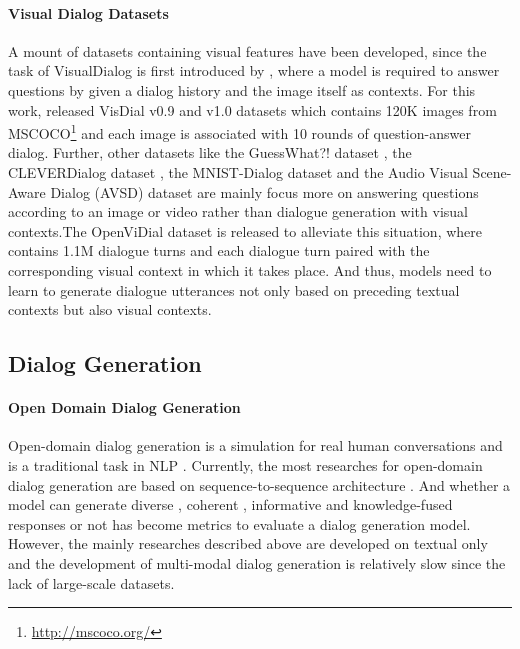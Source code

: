 \documentclass[11pt,a4paper]{article}
\begin{document}
\paragraph{Visual Dialog Datasets} A mount of datasets containing visual features have been developed, since the task of VisualDialog is first introduced by \citet{das2017visual}, where a model is required to answer questions by given a dialog history and the image itself as contexts. For this work, \citet{das2017visual} released VisDial v0.9 and v1.0 datasets which contains 120K images from MSCOCO\footnote{\url{http://mscoco.org/}} and each image is associated with 10 rounds of question-answer dialog. Further, other datasets like the GuessWhat?! dataset \cite{devries2017guesswhat}, the CLEVERDialog dataset \cite{kottur2019clevrdialog}, the MNIST-Dialog dataset \cite{seo2017visual} and the Audio Visual Scene-Aware Dialog (AVSD) dataset \citep{hori2018endtoend,alamri2019audio} are mainly focus more on answering questions according to an image or video rather than dialogue generation with visual contexts.The OpenViDial dataset \cite{meng2020openvidial} is released to alleviate this situation, where contains 1.1M dialogue turns and each dialogue turn paired with the corresponding visual context in which it takes place. And thus, models need to learn to generate dialogue utterances not only based on preceding textual contexts but also visual contexts.

\subsection{Dialog Generation}

\paragraph{Open Domain Dialog Generation} Open-domain dialog generation is a simulation for real human conversations and is a traditional task in NLP \citep{weizenbaum1966eliza, COLBY197537, Wallace2009}. Currently, the most researches for open-domain dialog generation are based on sequence-to-sequence architecture \citep{vinyals2015neural, li2015diversity, dodge2016evaluating, serban2016hierarchical, zhao2017learning, xie2017data, lee2019convlab, ghandeharioun2019approximating, li2020teaching, han2020explaining, zhang2019dialogpt, roller2020recipes}. And whether a model can generate diverse \citep{xu2018dp, baheti2018generating}, coherent \citep{li2016deep,li2017adversarial,tian-etal-2017-make,bosselut-etal-2018-discourse,adiwardana2020towards}, informative \citep{shao2017generating,lewis-etal-2017-deal,ghazvininejad2017knowledge,young2017augmenting,zhao2019rethinking} and knowledge-fused \citep{10.1145/3340531.3411967,zhao-etal-2020-knowledge-grounded,he-etal-2020-amalgamating} responses or not has become metrics to evaluate a dialog generation model. However, the mainly researches described above are developed on textual only and the development of multi-modal dialog generation is relatively slow since the lack of large-scale datasets.
\end{document}
